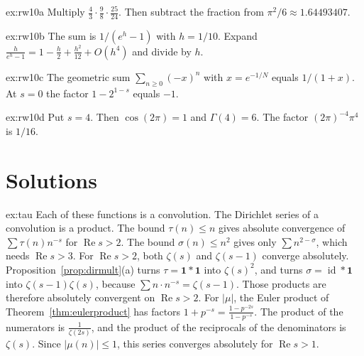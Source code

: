 \begin{hint}{ex:rw10a}
Multiply $\frac43\cdot\frac98\cdot\frac{25}{24}$. Then subtract the fraction from $\pi^2/6\approx1.64493407$.
\end{hint}

\begin{hint}{ex:rw10b}
The sum is $1/(e^h-1)$ with $h=1/10$. Expand $\frac h{e^h-1}=1-\frac h2+\frac{h^2}{12}+O(h^4)$ and divide by $h$.
\end{hint}

\begin{hint}{ex:rw10c}
The geometric sum $\sum_{n\ge0}(-x)^n$ with $x=e^{-1/N}$ equals $1/(1+x)$. At $s=0$ the factor $1-2^{1-s}$ equals $-1$.
\end{hint}

\begin{hint}{ex:rw10d}
Put $s=4$. Then $\cos(2\pi)=1$ and $\Gamma(4)=6$. The factor $(2\pi)^{-4}\pi^4$ is $1/16$.
\end{hint}

\section{Solutions}

\begin{solution}{ex:tau}
\idea Each of these functions is a convolution. The Dirichlet series of a convolution is a product.
\writeup The bound $\tau(n)\le n$ gives absolute convergence of $\sum\tau(n)n^{-s}$ for $\operatorname{Re}s>2$. The bound $\sigma(n)\le n^2$ gives only $\sum n^{2-\sigma}$, which needs $\operatorname{Re}s>3$. For $\operatorname{Re}s>2$, both $\zeta(s)$ and $\zeta(s-1)$ converge absolutely. Proposition~\ref{prop:dirmult}(a) turns $\tau=\mathbf 1*\mathbf 1$ into $\zeta(s)^2$, and turns $\sigma=\operatorname{id}*\mathbf 1$ into $\zeta(s-1)\zeta(s)$, because $\sum n\cdot n^{-s}=\zeta(s-1)$. Those products are therefore absolutely convergent on $\operatorname{Re}s>2$. For $|\mu|$, the Euler product of Theorem~\ref{thm:eulerproduct} has factors $1+p^{-s}=\frac{1-p^{-2s}}{1-p^{-s}}$. The product of the numerators is $\frac1{\zeta(2s)}$, and the product of the reciprocals of the denominators is $\zeta(s)$. Since $|\mu(n)|\le1$, this series converges absolutely for $\operatorname{Re}s>1$.
\end{solution}

